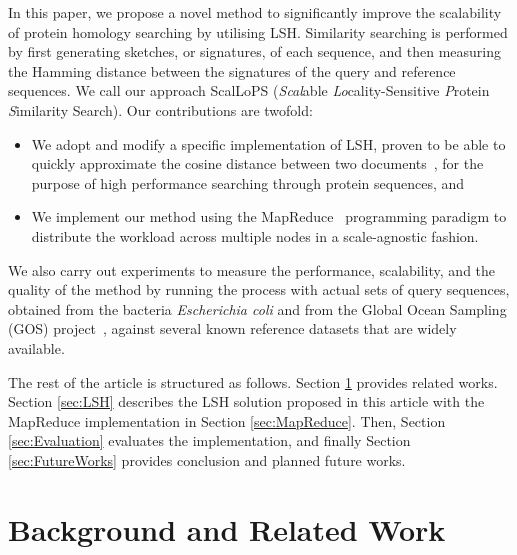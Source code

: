 \documentclass[titlepage]{csetr}
\begin{document}
In this paper, we propose a novel method to significantly improve the scalability of protein homology searching by utilising LSH. Similarity searching is performed by first generating sketches, or signatures, of each sequence, and then measuring the Hamming distance between the signatures of the query and reference sequences. We call our approach ScalLoPS (\emph{Scal}able \emph{Lo}cality-Sensitive \emph{P}rotein \emph{S}imilarity Search). Our contributions are twofold:
\begin{itemize}
  \item  We adopt and modify a specific implementation of LSH, proven to be able to quickly approximate the cosine distance between two documents~\cite{Simhash}, for the purpose of high performance searching through protein sequences, and
  \item  We implement our method using the MapReduce~\cite{MapReduce} programming paradigm to distribute the workload across multiple nodes in a scale-agnostic fashion.
\end{itemize}

We also carry out experiments to measure the performance, scalability, and the quality of the method by running the process with actual sets of query sequences, obtained from the bacteria \emph{Escherichia coli} and from the Global Ocean Sampling (GOS) project~\cite{GOS}, against several known reference datasets that are widely available.
























The rest of the article is structured as follows. Section \ref{sec:relworks} provides related works. Section \ref{sec:LSH} describes the LSH solution proposed in this article with the MapReduce implementation in Section \ref{sec:MapReduce}. Then, Section \ref{sec:Evaluation} evaluates the implementation, and finally Section \ref{sec:FutureWorks} provides conclusion and planned future works.

\section{Background and Related Work}
\label{sec:relworks}
\end{document}
